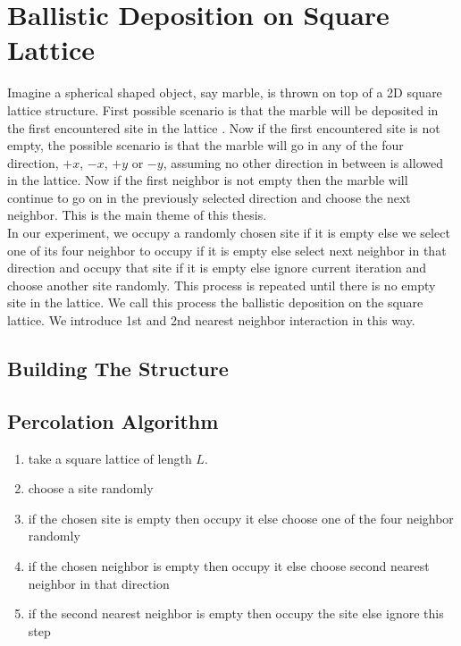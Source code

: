 \chapter{Ballistic Deposition on Square Lattice}

\ifpdf
    \graphicspath{{Chapter5/Figs/}{Chapter5/Figs/L0/}{Chapter5/Figs/L1/}{Chapter5/Figs/L2/}}
\else
    \graphicspath{{Chapter5/Figs/}{Chapter5/Figs/L0/}{Chapter5/Figs/L1/}{Chapter5/Figs/L2/}}
\fi

Imagine a spherical shaped object, say marble, is thrown on top of a 2D square lattice structure. First possible scenario is that the marble will be deposited in the first encountered site in the lattice . Now if the first encountered site is not empty, the possible scenario is that the marble will go in any of the four direction, $+x$, $-x$, $+y$ or $-y$, assuming no other direction in between is allowed in the lattice.  Now if the first neighbor is not empty then the marble will continue to go on in the previously selected direction and choose the next neighbor. This is the main theme of this thesis.\\
In our experiment, we occupy a randomly chosen site if it is empty else we select one of its four neighbor to occupy if it is empty else select next neighbor in that direction and occupy that site if it is empty else ignore current iteration and choose another site randomly. This process is repeated until there is no empty site in the lattice. We call this process the ballistic deposition on the square lattice. We introduce 1st and 2nd nearest neighbor interaction in this way.
\section{Building The Structure}
\section{Percolation Algorithm}
\begin{enumerate}
	\item take a square lattice of length $L$.
	\item choose a site randomly
	\item if the chosen site is empty then occupy it else choose one of the four neighbor randomly
	\item if the chosen neighbor is empty then occupy it else choose second nearest neighbor in that direction
	\item if the second nearest neighbor is empty then occupy the site else ignore this step
\end{enumerate}
